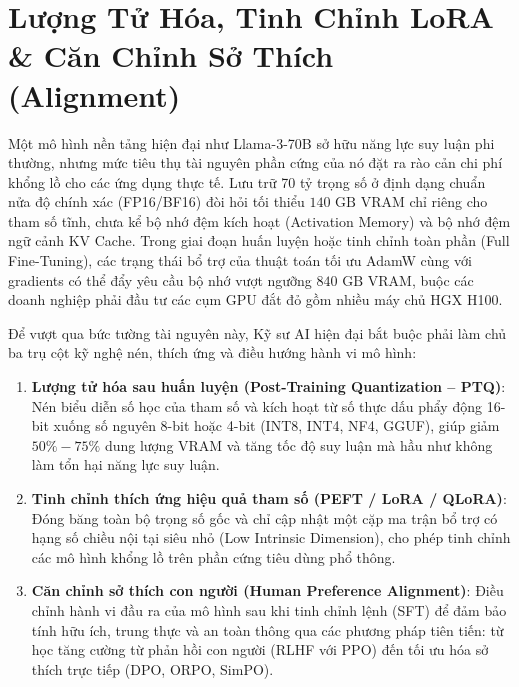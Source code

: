 
\chapter{Lượng Tử Hóa, Tinh Chỉnh LoRA \& Căn Chỉnh Sở Thích (Alignment)}
\label{ch:quantization-lora}

Một mô hình nền tảng hiện đại như Llama-3-70B sở hữu năng lực suy luận phi thường, nhưng mức tiêu thụ tài nguyên phần cứng của nó đặt ra rào cản chi phí khổng lồ cho các ứng dụng thực tế. Lưu trữ 70 tỷ trọng số ở định dạng chuẩn nửa độ chính xác (FP16/BF16) đòi hỏi tối thiểu $140\text{ GB}$ VRAM chỉ riêng cho tham số tĩnh, chưa kể bộ nhớ đệm kích hoạt (Activation Memory) và bộ nhớ đệm ngữ cảnh KV Cache. Trong giai đoạn huấn luyện hoặc tinh chỉnh toàn phần (Full Fine-Tuning), các trạng thái bổ trợ của thuật toán tối ưu AdamW cùng với gradients có thể đẩy yêu cầu bộ nhớ vượt ngưỡng $840\text{ GB}$ VRAM, buộc các doanh nghiệp phải đầu tư các cụm GPU đắt đỏ gồm nhiều máy chủ HGX H100.

Để vượt qua bức tường tài nguyên này, Kỹ sư AI hiện đại bắt buộc phải làm chủ ba trụ cột kỹ nghệ nén, thích ứng và điều hướng hành vi mô hình:
\begin{enumerate}
  \item \textbf{Lượng tử hóa sau huấn luyện (Post-Training Quantization -- PTQ)}: Nén biểu diễn số học của tham số và kích hoạt từ số thực dấu phẩy động 16-bit xuống số nguyên 8-bit hoặc 4-bit (INT8, INT4, NF4, GGUF), giúp giảm $50\% - 75\%$ dung lượng VRAM và tăng tốc độ suy luận mà hầu như không làm tổn hại năng lực suy luận.
  \item \textbf{Tinh chỉnh thích ứng hiệu quả tham số (PEFT / LoRA / QLoRA)}: Đóng băng toàn bộ trọng số gốc và chỉ cập nhật một cặp ma trận bổ trợ có hạng số chiều nội tại siêu nhỏ (Low Intrinsic Dimension), cho phép tinh chỉnh các mô hình khổng lồ trên phần cứng tiêu dùng phổ thông.
  \item \textbf{Căn chỉnh sở thích con người (Human Preference Alignment)}: Điều chỉnh hành vi đầu ra của mô hình sau khi tinh chỉnh lệnh (SFT) để đảm bảo tính hữu ích, trung thực và an toàn thông qua các phương pháp tiên tiến: từ học tăng cường từ phản hồi con người (RLHF với PPO) đến tối ưu hóa sở thích trực tiếp (DPO, ORPO, SimPO).
\end{enumerate}


